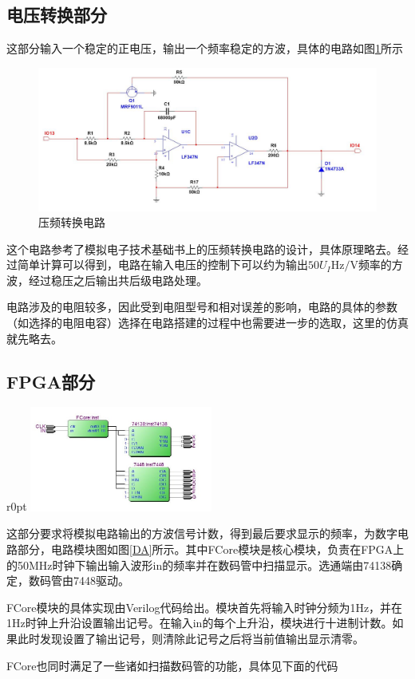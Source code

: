 \documentclass[UTF8,a4paper]{paper}
\begin{document}
\subsection{电压转换部分}
这部分输入一个稳定的正电压，输出一个频率稳定的方波，具体的电路如图\ref{VF}所示
\begin{figure}[b]
\centering
\includegraphics[width=\textwidth]{VF.jpg}
\caption{压频转换电路}
\label{VF}
\end{figure}

这个电路参考了模拟电子技术基础书上的压频转换电路的设计，具体原理略去。经过简单计算可以得到，电路在输入电压的控制下可以约为输出$50U_I\mathrm{Hz/V}$频率的方波，经过稳压之后输出共后级电路处理。

电路涉及的电阻较多，因此受到电阻型号和相对误差的影响，电路的具体的参数（如选择的电阻电容）选择在电路搭建的过程中也需要进一步的选取，这里的仿真就先略去。
\clearpage
\subsection{FPGA部分}
\begin {wrapfigure}{r}{0pt}
\includegraphics [width=60mm]{Block.jpg}
\caption{频率计数电路布置}
\label{DA}
\end {wrapfigure}
这部分要求将模拟电路输出的方波信号计数，得到最后要求显示的频率，为数字电路部分，电路模块图如图\ref{DA}所示。其中FCore模块是核心模块，负责在FPGA上的50MHz时钟下输出输入波形in的频率并在数码管中扫描显示。选通端由74138确定，数码管由7448驱动。

FCore模块的具体实现由Verilog代码给出。模块首先将输入时钟分频为1Hz，并在1Hz时钟上升沿设置输出记号。在输入in的每个上升沿，模块进行十进制计数。如果此时发现设置了输出记号，则清除此记号之后将当前值输出显示清零。

FCore也同时满足了一些诸如扫描数码管的功能，具体见下面的代码


\end{document}
